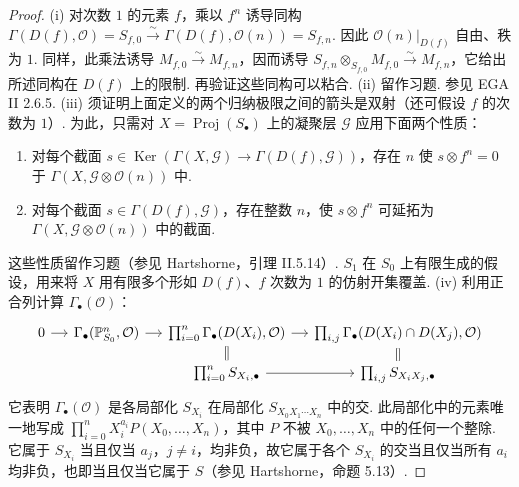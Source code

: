 \begin{proof}
\textup{(i)} 对次数 $1$ 的元素 $f$，乘以 $f^n$ 诱导同构 $\Gamma(D(f),\mathcal O)=S_{f,0}\xrightarrow\sim\Gamma(D(f),\mathcal O(n))=S_{f,n}$. 因此 $\mathcal O(n)|_{D(f)}$ 自由、秩为 $1$. 同样，此乘法诱导 $M_{f,0}\xrightarrow\sim M_{f,n}$，因而诱导 $S_{f,n}\otimes_{S_{f,0}}M_{f,0}\xrightarrow\sim M_{f,n}$，它给出所述同构在 $D(f)$ 上的限制. 再验证这些同构可以粘合.
\textup{(ii)} 留作习题. 参见 EGA II 2.6.5.
\textup{(iii)} 须证明上面定义的两个归纳极限之间的箭头是双射（还可假设 $f$ 的次数为 $1$）. 为此，只需对 $X=\operatorname{Proj}(S_\bullet)$ 上的凝聚层 $\mathcal G$ 应用下面两个性质：
\begin{enumerate}[label=\roman*)]
\item 对每个截面 $s\in\operatorname{Ker}(\Gamma(X,\mathcal G)\longrightarrow\Gamma(D(f),\mathcal G))$，存在 $n$ 使 $s\otimes f^n=0$ 于 $\Gamma(X,\mathcal G\otimes\mathcal O(n))$ 中.
\item 对每个截面 $s\in\Gamma(D(f),\mathcal G)$，存在整数 $n$，使 $s\otimes f^n$ 可延拓为 $\Gamma(X,\mathcal G\otimes\mathcal O(n))$ 中的截面.
\end{enumerate}
这些性质留作习题（参见 Hartshorne，引理 II.5.14）. $S_1$ 在 $S_0$ 上有限生成的假设，用来将 $X$ 用有限多个形如 $D(f)$、$f$ 次数为 $1$ 的仿射开集覆盖.
\textup{(iv)} 利用正合列计算 $\Gamma_\bullet(\mathcal O)$：
\begin{align*}
\begin{tikzcd}[ampersand replacement=\&,column sep=small,row sep=small]
0\arrow[r]\&\Gamma_\bullet(\mathbb P_{S_0}^n,\mathcal O)\arrow[r]\&\prod_{i=0}^n\Gamma_\bullet(D(X_i),\mathcal O)\arrow[r]\arrow[d,equal]\&\prod_{i,j}\Gamma_\bullet(D(X_i)\cap D(X_j),\mathcal O)\arrow[d,equal]\\
\&\&\prod_{i=0}^nS_{X_i,\bullet}\arrow[r]\&\prod_{i,j}S_{X_iX_j,\bullet}
\end{tikzcd}
\end{align*}
它表明 $\Gamma_\bullet(\mathcal O)$ 是各局部化 $S_{X_i}$ 在局部化 $S_{X_0X_1\cdots X_n}$ 中的交. 此局部化中的元素唯一地写成 $\prod_{i=0}^nX_i^{a_i}P(X_0,\ldots,X_n)$，其中 $P$ 不被 $X_0,\ldots,X_n$ 中的任何一个整除. 它属于 $S_{X_i}$ 当且仅当 $a_j$，$j\ne i$，均非负，故它属于各个 $S_{X_i}$ 的交当且仅当所有 $a_i$ 均非负，也即当且仅当它属于 $S$（参见 Hartshorne，命题 5.13）.
\end{proof}
